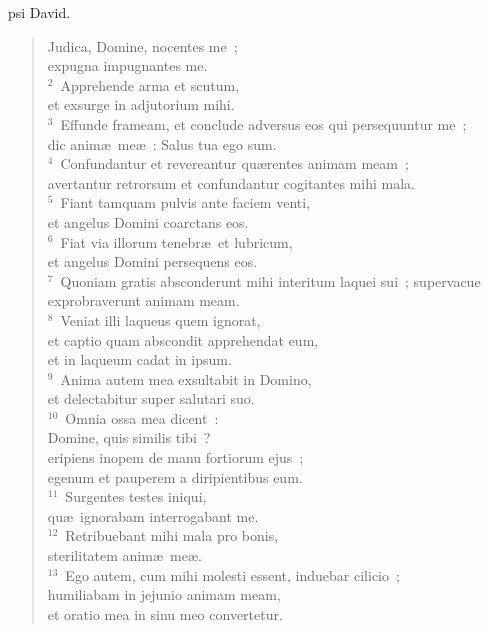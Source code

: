 \bchapter
{}psi David. \begin{flushleft}\begin{verse}\vspace{6pt}Judica, Domine, nocentes me~;\\ expugna impugnantes me.\\
${}^{2}$~Apprehende arma et scutum,\\ et exsurge in adjutorium mihi.\\
${}^{3}$~Effunde frameam, et conclude adversus eos qui persequuntur me~;\\ dic anim\ae\ me\ae~: Salus tua ego sum.\\
${}^{4}$~Confundantur et revereantur qu\ae rentes animam meam~;\\ avertantur retrorsum et confundantur cogitantes mihi mala.\\
${}^{5}$~Fiant tamquam pulvis ante faciem venti,\\ et angelus Domini coarctans eos.\\
${}^{6}$~Fiat via illorum tenebr\ae\ et lubricum,\\ et angelus Domini persequens eos.\\
${}^{7}$~Quoniam gratis absconderunt mihi interitum laquei sui~; supervacue exprobraverunt animam meam.\\
${}^{8}$~Veniat illi laqueus quem ignorat,\\ et captio quam abscondit apprehendat eum,\\ et in laqueum cadat in ipsum.\\
${}^{9}$~Anima autem mea exsultabit in Domino,\\ et delectabitur super salutari suo.\\
${}^{10}$~Omnia ossa mea dicent~:\\ Domine, quis similis tibi~?\\ eripiens inopem de manu fortiorum ejus~;\\ egenum et pauperem a diripientibus eum.\\
${}^{11}$~Surgentes testes iniqui,\\ qu\ae\ ignorabam interrogabant me.\\
${}^{12}$~Retribuebant mihi mala pro bonis,\\ sterilitatem anim\ae\ me\ae .\\
${}^{13}$~Ego autem, cum mihi molesti essent, induebar cilicio~;\\ humiliabam in jejunio animam meam,\\ et oratio mea in sinu meo convertetur.\\

\end{verse}
\end{flushleft}
